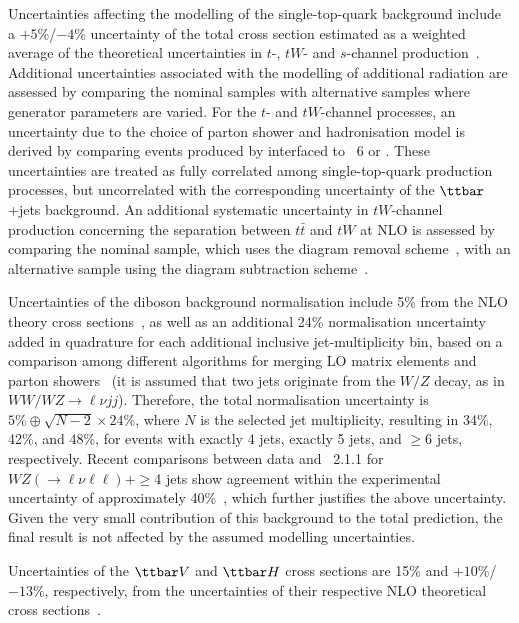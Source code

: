 Uncertainties affecting the modelling of the single-top-quark background include a 
$+5\%$/$-4\%$ uncertainty of the total cross section estimated as a weighted average 
of the theoretical uncertainties in $t$-, $tW$- and $s$-channel production~\cite{Kidonakis:2011wy,Kidonakis:2010ux,Kidonakis:2010tc}.
Additional uncertainties associated with the modelling of additional radiation are assessed by comparing the nominal
samples with alternative samples where generator parameters are varied.
For the $t$- and $tW$-channel processes, an uncertainty due to the choice of parton shower and hadronisation model is derived 
by comparing events produced by {\powheg} interfaced to {\pythia}~6 or {\herwigpp}.
These uncertainties are treated as fully correlated among single-top-quark production processes, but uncorrelated with the
corresponding uncertainty of the $\ttbar$+jets background.
An additional systematic uncertainty in $tW$-channel production concerning the separation 
between $t\bar{t}$ and $tW$ at NLO is assessed by comparing
the nominal sample, which uses the diagram removal scheme~\cite{Frixione:2008yi}, with an alternative sample
using the diagram subtraction scheme~\cite{Frixione:2008yi}.

Uncertainties of the diboson background normalisation include 5\% from the NLO theory cross sections~\cite{Campbell:1999ah,Campbell:2011bn},
as well as an additional 24\% normalisation uncertainty added in quadrature for each additional inclusive jet-multiplicity bin, based on a 
comparison among different algorithms for merging LO matrix elements and parton showers~\cite{Alwall:2007fs}
(it is assumed that two jets originate from the $W/Z$ decay, as in $WW/WZ \to \ell \nu jj$). 
Therefore, the total normalisation uncertainty is $5\% \oplus \sqrt{N-2}\times 24\%$, where $N$ is the selected jet multiplicity,  
resulting in 34\%, 42\%, and 48\%, for events with exactly 4 jets, exactly 5 jets, and $\geq$6 jets, respectively. 
Recent comparisons between data and {\sherpa}~2.1.1 for $WZ(\to \ell\nu\ell\ell) + \geq$4 jets show
agreement within the experimental uncertainty of approximately 40\%~\cite{Aaboud:2016yus}, which further justifies the above uncertainty.
Given the very small contribution of this background to the total prediction, the final result is not affected by the assumed modelling
uncertainties.

Uncertainties of the $\ttbar V$ and $\ttbar H$ cross sections are 15\% and $+10\%$/$-13\%$, respectively,
from the uncertainties of their respective NLO theoretical cross sections~\cite{Campbell:2012dh,Garzelli:2012bn,deFlorian:2016spz}. 

